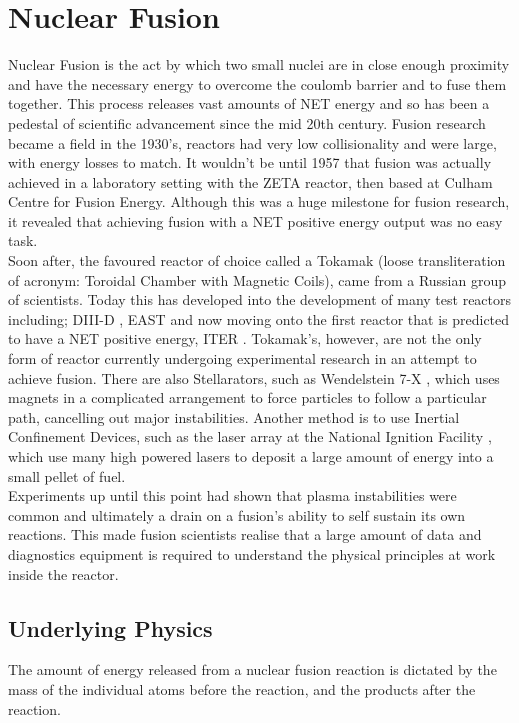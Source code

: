 \documentclass[12pt,a4paper,oneside]{report}
\begin{document}
	\section{Nuclear Fusion}
Nuclear Fusion is the act by which two small nuclei are in close enough proximity and have the necessary energy to overcome the coulomb barrier and to fuse them together. This process releases vast amounts of NET energy and so has been a pedestal of scientific advancement since the mid 20th century. Fusion research became a field in the 1930's, reactors had very low collisionality and were large, with energy losses to match. It wouldn't be until 1957 that fusion was actually achieved in a laboratory setting with the ZETA reactor, then based at Culham Centre for Fusion Energy. Although this was a huge milestone for fusion research, it revealed that achieving fusion with a NET positive energy output was no easy task. \\
Soon after, the favoured reactor of choice called a Tokamak (loose transliteration of acronym: Toroidal Chamber with Magnetic Coils), came from a Russian group of scientists. Today this has developed into the development of many test reactors including; DIII-D \cite{AymarOverviewExperiment} , EAST \cite{Gao2008DiagnosticsTokamak} and now moving onto the first reactor that is predicted to have a NET positive energy, ITER \cite{Litaudon2017OverviewITER}. Tokamak's, however, are not the only form of reactor currently undergoing experimental research in an attempt to achieve fusion. There are also Stellarators, such as Wendelstein 7-X \cite{Klinger2016Wendelstein7-X}, which uses magnets in a complicated arrangement to force particles to follow a particular path, cancelling out major instabilities. Another method is to use Inertial Confinement Devices, such as the laser array at the National Ignition Facility \cite{Lindl1995DevelopmentGain}, which use many high powered lasers to deposit a large amount of energy into a small pellet of fuel. 
\\
Experiments up until this point had shown that plasma instabilities were common and ultimately a drain on a fusion's ability to self sustain its own reactions. This made fusion scientists realise that a large amount of data and diagnostics equipment is required to understand the physical principles at work inside the reactor.
\\
	\subsection{Underlying Physics}
The amount of energy released from a nuclear fusion reaction is dictated by the mass of the individual atoms before the reaction, and the products after the reaction. \linebreak
\end{document}
